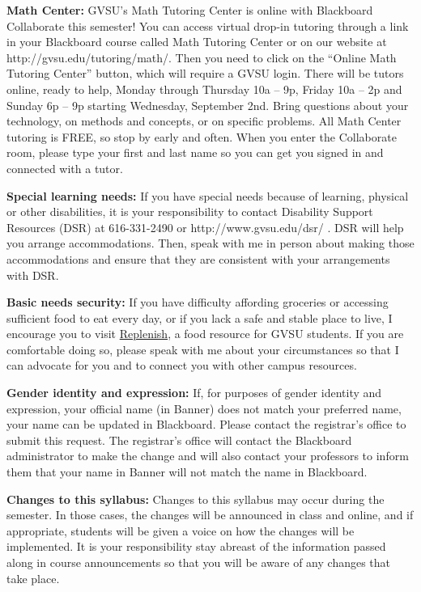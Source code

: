 \documentclass[]{article}
\begin{document}
\textbf{Math Center:} GVSU's Math Tutoring Center is online with
Blackboard Collaborate this semester! You can access virtual drop-in
tutoring through a link in your Blackboard course called Math Tutoring
Center or on our website at http://gvsu.edu/tutoring/math/. Then you
need to click on the ``Online Math Tutoring Center'' button, which will
require a GVSU login. There will be tutors online, ready to help, Monday
through Thursday 10a -- 9p, Friday 10a -- 2p and Sunday 6p -- 9p
starting Wednesday, September 2nd. Bring questions about your
technology, on methods and concepts, or on specific problems. All Math
Center tutoring is FREE, so stop by early and often. When you enter the
Collaborate room, please type your first and last name so you can get
you signed in and connected with a tutor.

\textbf{Special learning needs:} If you have special needs because of
learning, physical or other disabilities, it is your responsibility to
contact Disability Support Resources (DSR) at 616-331-2490 or
http://www.gvsu.edu/dsr/ . DSR will help you arrange accommodations.
Then, speak with me in person about making those accommodations and
ensure that they are consistent with your arrangements with DSR.

\textbf{Basic needs security:} If you have difficulty affording
groceries or accessing sufficient food to eat every day, or if you lack
a safe and stable place to live, I encourage you to visit
\href{https://www.gvsu.edu/replenish/}{Replenish}, a food resource for
GVSU students. If you are comfortable doing so, please speak with me
about your circumstances so that I can advocate for you and to connect
you with other campus resources.

\textbf{Gender identity and expression:} If, for purposes of gender
identity and expression, your official name (in Banner) does not match
your preferred name, your name can be updated in Blackboard. Please
contact the registrar's office to submit this request. The registrar's
office will contact the Blackboard administrator to make the change and
will also contact your professors to inform them that your name in
Banner will not match the name in Blackboard.

\textbf{Changes to this syllabus:} Changes to this syllabus may occur
during the semester. In those cases, the changes will be announced in
class and online, and if appropriate, students will be given a voice on
how the changes will be implemented. It is your responsibility stay
abreast of the information passed along in course announcements so that
you will be aware of any changes that take place.
\end{document}
